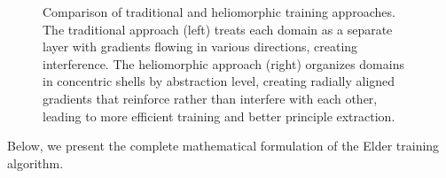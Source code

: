 \begin{figure}[h]
\caption{Comparison of traditional and heliomorphic training approaches. The traditional approach (left) treats each domain as a separate layer with gradients flowing in various directions, creating interference. The heliomorphic approach (right) organizes domains in concentric shells by abstraction level, creating radially aligned gradients that reinforce rather than interfere with each other, leading to more efficient training and better principle extraction.}
\label{fig:training_comparison}
\end{figure}

Below, we present the complete mathematical formulation of the Elder training algorithm.

